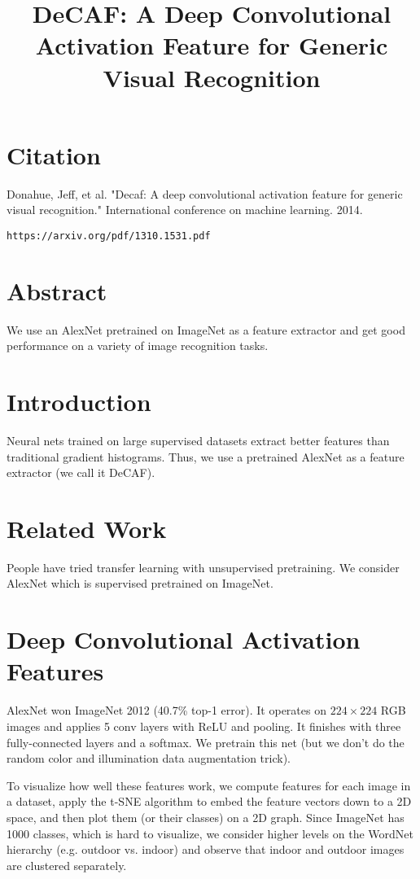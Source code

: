 \documentclass[a4paper]{article}
\title{DeCAF: A Deep Convolutional Activation Feature for Generic Visual Recognition}
\date{}
\begin{document}
\maketitle

\section{Citation}
Donahue, Jeff, et al. "Decaf: A deep convolutional activation feature for generic visual recognition." International conference on machine learning. 2014.

\begin{verbatim}
https://arxiv.org/pdf/1310.1531.pdf
\end{verbatim}

\section{Abstract}
We use an AlexNet pretrained on ImageNet as a feature extractor and get good
performance on a variety of image recognition tasks.

\section{Introduction}
Neural nets trained on large supervised datasets extract better features than
traditional gradient histograms. Thus, we use a pretrained AlexNet as a feature
extractor (we call it DeCAF).

\section{Related Work}
People have tried transfer learning with unsupervised pretraining. We consider
AlexNet which is supervised pretrained on ImageNet.

\section{Deep Convolutional Activation Features}
AlexNet won ImageNet 2012 (40.7\% top-1 error). It operates on $224 \times 224$
RGB images and applies 5 conv layers with ReLU and pooling. It finishes with
three fully-connected layers and a softmax. We pretrain this net (but we don't
do the random color and illumination data augmentation trick).

To visualize how well these features work, we compute features for each image
in a dataset, apply the t-SNE algorithm to embed the feature vectors down to
a 2D space, and then plot them (or their classes) on a 2D graph. Since
ImageNet has 1000 classes, which is hard to visualize, we consider higher
levels on the WordNet hierarchy (e.g. outdoor vs. indoor) and observe that
indoor and outdoor images are clustered separately.
\end{document}
